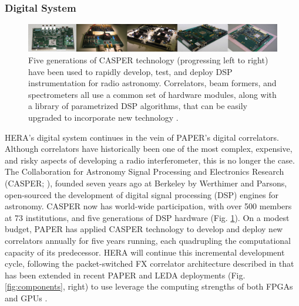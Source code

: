 \documentclass[preprint]{aastex}
\newcommand{\compress}{\vspace{-0.3in}}
\begin{document}
%



\compress
\subsubsection{Digital System}
\label{sec:digital}

\begin{figure}[t]\centering
\includegraphics[width=6.5in]{plots/casper_boards.jpg}
\caption{\small
Five generations of CASPER technology (progressing left to right) have been used to rapidly
develop, test, and deploy DSP instrumentation for radio astronomy.  Correlators,
beam formers, and spectrometers all use a common set of hardware modules, along with a library
of parametrized DSP algorithms, that can be easily upgraded to incorporate new technology
\citep{parsons_et_al2006,parsons_et_al2008}.
}\label{fig:casper_boards}
\end{figure}

HERA's digital system continues in the vein of PAPER's digital correlators.
Although correlators have historically been one of the most complex,
expensive, and risky aspects of developing a radio interferometer, this is no longer the case.
The Collaboration for Astronomy Signal Processing and Electronics Research
(CASPER; \citealt{parsons_et_al2006}), founded seven years ago at Berkeley
by Werthimer and Parsons, open-sourced the development of digital signal processing (DSP) engines for astronomy.
CASPER now has world-wide participation,
with over 500 members at 73 institutions, and 
five generations of DSP hardware (Fig. \ref{fig:casper_boards}). 
On a modest budget, PAPER has applied CASPER technology to develop and deploy new correlators
annually for five years running, each quadrupling the computational capacity of its predecessor.
HERA will continue this incremental development cycle, following the packet-switched
FX correlator architecture described in \citet{parsons_et_al2008} that has been
extended in recent PAPER and LEDA deployments (Fig. \ref{fig:components}, right)
to use leverage the computing strengths of both FPGAs and GPUs \citep{clark_et_al2011}.
\end{document}
